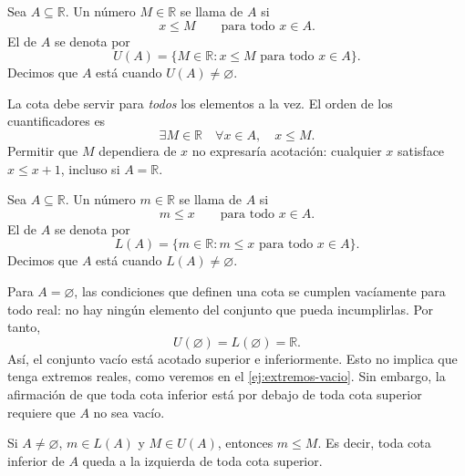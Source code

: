 \begin{samepage}
\begin{definition}
\label{def:cotas-superiores}
Sea $A\subseteq\mathbb{R}$. Un número $M\in\mathbb{R}$ se llama  de $A$ si
\[
 x\leq M\qquad\text{para todo }x\in A.
\]
El  de $A$ se denota por
\[
 U(A)=\{M\in\mathbb{R}: x\leq M\text{ para todo }x\in A\}.
\]
Decimos que $A$ está  cuando $U(A)\neq\varnothing$.
\end{definition}
\end{samepage}

La cota debe servir para \emph{todos} los elementos a la vez. El orden de los cuantificadores es
\[
\exists M\in\mathbb{R}\quad\forall x\in A,\quad x\leq M.
\]
Permitir que $M$ dependiera de $x$ no expresaría acotación: cualquier $x$ satisface $x\leq x+1$, incluso si $A=\mathbb{R}$.

\begin{samepage}
\begin{definition}
\label{def:cotas-inferiores}
Sea $A\subseteq\mathbb{R}$. Un número $m\in\mathbb{R}$ se llama  de $A$ si
\[
 m\leq x\qquad\text{para todo }x\in A.
\]
El  de $A$ se denota por
\[
 L(A)=\{m\in\mathbb{R}: m\leq x\text{ para todo }x\in A\}.
\]
Decimos que $A$ está  cuando $L(A)\neq\varnothing$.
\end{definition}
\end{samepage}

\begin{remark}
\label{obs:cotas-vacio}
Para $A=\varnothing$, las condiciones que definen una cota se cumplen vacíamente para todo real: no hay ningún elemento del conjunto que pueda incumplirlas. Por tanto,
\[
 U(\varnothing)=L(\varnothing)=\mathbb{R}.
\]
Así, el conjunto vacío está acotado superior e inferiormente. Esto no implica que tenga extremos reales, como veremos en el \cref{ej:extremos-vacio}. Sin embargo, la afirmación de que toda cota inferior está por debajo de toda cota superior requiere que $A$ no sea vacío.
\end{remark}

\begin{samepage}
\begin{proposition}
\label{prop:comparacion-cotas}
Si $A\neq\varnothing$, $m\in L(A)$ y $M\in U(A)$, entonces $m\leq M$. Es decir, toda cota inferior de $A$ queda a la izquierda de toda cota superior.
\end{proposition}
\end{samepage}

